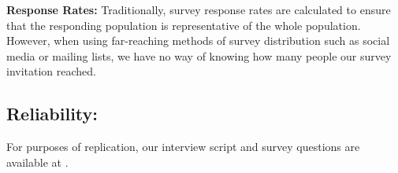 \textbf{Response Rates:}
Traditionally, survey response rates are calculated to ensure that the responding population is representative of the whole population. However, when using far-reaching methods of survey distribution such as social media or mailing lists, we have no way of knowing how many people our survey invitation reached.

\subsection{Reliability:}
For purposes of replication, our interview script and survey questions are available at \cite{companion_site}. 

